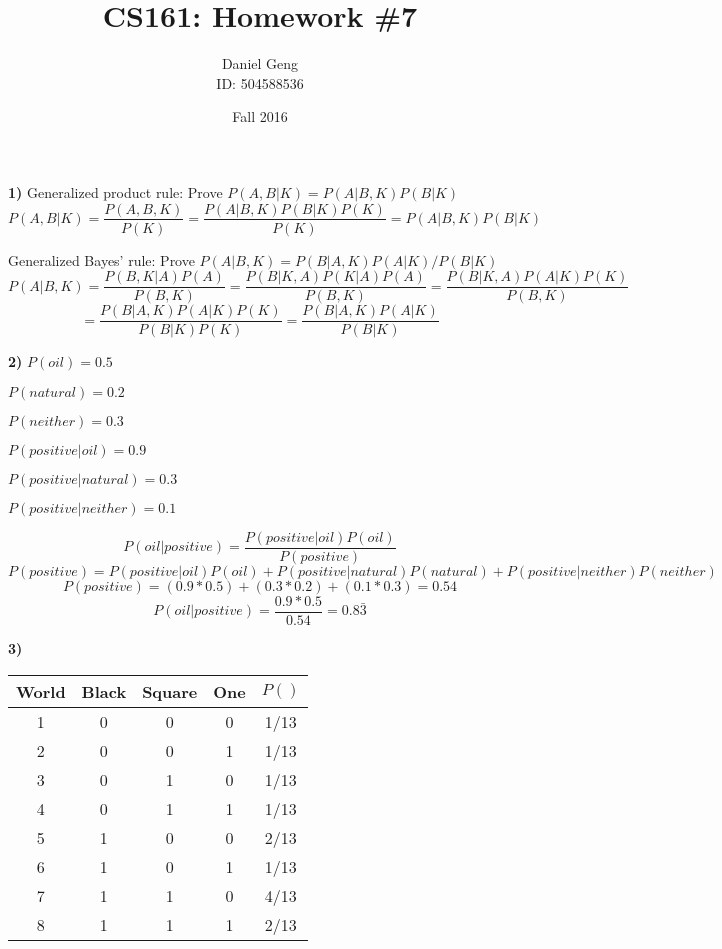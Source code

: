 \documentclass[11pt, oneside]{article}   	%
\title{CS161: Homework \#7}
\author{Daniel Geng\\ID: 504588536}
\date{Fall 2016}							%
\begin{document}
\maketitle
\textbf{1)} Generalized product rule: Prove $P(A,B | K) = P(A | B,K)P(B|K)$
\begin{equation*} P(A,B|K) = \frac{P(A,B,K)}{P(K)} = \frac{P(A|B,K)P(B|K)P(K)}{P(K)} = P(A|B,K)P(B|K) \end{equation*}

Generalized Bayes' rule: Prove $P(A|B,K) = P(B|A,K)P(A|K) / P(B|K)$
\begin{equation*} P(A|B,K) = \frac{P(B,K|A)P(A)}{P(B,K)} = \frac{P(B|K,A)P(K|A)P(A)}{P(B,K)} = \frac{P(B|K,A)P(A|K)P(K)}{P(B,K)} \end{equation*} \begin{equation*} = \frac{P(B|A,K)P(A|K)P(K)}{P(B|K)P(K)} = \frac{P(B|A,K)P(A|K)}{P(B|K)} \end{equation*}

\textbf{2)} $P(oil) = 0.5$

$P(natural) = 0.2$

$P(neither) = 0.3$

$P(positive|oil) = 0.9$

$P(positive|natural) = 0.3$

$P(positive|neither) = 0.1$

\begin{equation*} P(oil|positive) = \frac{P(positive|oil)P(oil)}{P(positive)} \end{equation*}
\begin{equation*} P(positive) = P(positive|oil)P(oil) + P(positive|natural)P(natural) + P(positive|neither)P(neither) \end{equation*}
\begin{equation*} P(positive) = (0.9*0.5) + (0.3*0.2) + (0.1*0.3) = 0.54 \end{equation*}
\begin{equation*} P(oil|positive) = \frac{0.9*0.5}{0.54} = 0.8\bar{3} \end{equation*}

\textbf{3)}

\begin{tabular}{ c | c | c | c | c }
World & Black & Square & One & $P()$ \\ 
\hline
1 & 0 & 0 & 0 & 1/13 \\
2 & 0 & 0 & 1 & 1/13 \\
3 & 0 & 1 & 0 & 1/13 \\
4 & 0 & 1 & 1 & 1/13 \\
5 & 1 & 0 & 0 & 2/13 \\
6 & 1 & 0 & 1 & 1/13 \\
7 & 1 & 1 & 0 & 4/13 \\
8 & 1 & 1 & 1 & 2/13 \\
\end{tabular}
\end{document}

